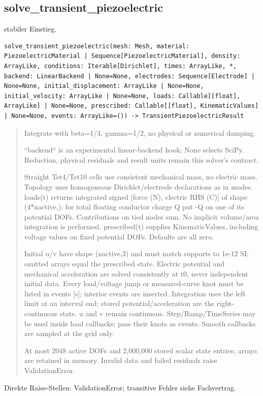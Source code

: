 \subsection{solve\_transient\_piezoelectric}
stabiler Einstieg.
\begin{lstlisting}
solve_transient_piezoelectric(mesh: Mesh, material: PiezoelectricMaterial | Sequence[PiezoelectricMaterial], density: ArrayLike, conditions: Iterable[Dirichlet], times: ArrayLike, *, backend: LinearBackend | None=None, electrodes: Sequence[Electrode] | None=None, initial_displacement: ArrayLike | None=None, initial_velocity: ArrayLike | None=None, loads: Callable[[float], ArrayLike] | None=None, prescribed: Callable[[float], KinematicValues] | None=None, events: ArrayLike=()) -> TransientPiezoelectricResult
\end{lstlisting}
\begin{quote}
Integrate with beta=1/4, gamma=1/2, no physical or numerical damping.\par ``backend`` is an experimental linear-backend hook; None selects SciPy. Reduction, physical residuals and result units remain this solver's contract.\par Straight Tet4/Tet10 cells use consistent mechanical mass, no electric mass. Topology uses homogeneous Dirichlet/electrode declarations as in modes. loads(t) returns integrated signed [force (N), electric RHS (C)] of shape (4*nactive,); for total floating conductor charge Q put -Q on one of its potential DOFs. Contributions on tied nodes sum. No implicit volume/area integration is performed. prescribed(t) supplies KinematicValues, including voltage values on fixed potential DOFs. Defaults are all zero.\par Initial u/v have shape (nactive,3) and must match supports to 1e-12 SI; omitted arrays equal the prescribed state. Electric potential and mechanical acceleration are solved consistently at t0, never independent initial data. Every load/voltage jump or measured-curve knot must be listed in events [s]; interior events are inserted. Integration uses the left limit at an interval end; stored potential/acceleration are the right-continuous state. u and v remain continuous. Step/Ramp/TimeSeries may be used inside load callbacks; pass their knots as events. Smooth callbacks are sampled at the grid only.\par At most 2048 active DOFs and 2,000,000 stored scalar state entries; arrays are retained in memory. Invalid data and failed residuals raise ValidationError.
\end{quote}
Direkte Raise-Stellen: ValidationError; transitive Fehler siehe Fachvertrag.
